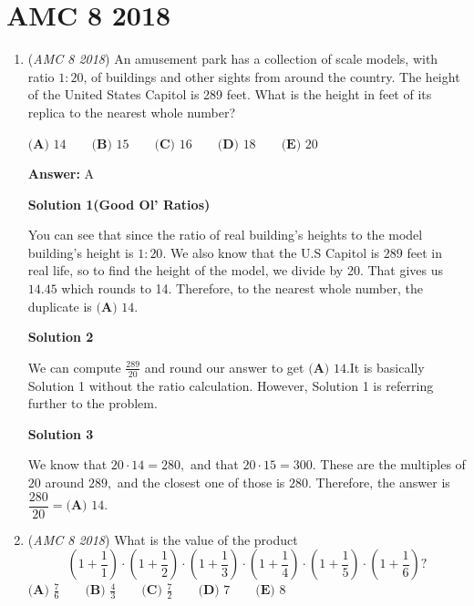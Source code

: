 \section{AMC 8 2018}
        \begin{enumerate}
        	\item (\textit{AMC 8 2018}) An amusement park has a collection of scale models, with ratio $1 : 20$, of buildings and other sights from around the country. The height of the United States Capitol is 289 feet. What is the height in feet of its replica to the nearest whole number?


 $\textbf{(A) }14\qquad\textbf{(B) }15\qquad\textbf{(C) }16\qquad\textbf{(D) }18\qquad\textbf{(E) }20$

 \textbf{Answer: }A



\textbf{Solution 1(Good Ol' Ratios)}

You can see that since the ratio of real building's heights to the model building's height is $1:20$. We also know that the U.S Capitol is $289$ feet in real life, so to find the height of the model, we divide by 20. That gives us $14.45$ which rounds to 14. Therefore, to the nearest whole number, the duplicate is $\boxed{\textbf{(A) }14}$.  

 



\textbf{Solution 2}

We can compute $\frac{289}{20}$ and round our answer to get $\boxed{\textbf{(A) }14}$.It is basically Solution 1 without the ratio calculation. However, Solution 1 is referring further to the problem.

 



\textbf{Solution 3}

We know that $20 \cdot 14 = 280 ,$ and that $20 \cdot 15 = 300 .$ These are the multiples of $20$ around $289 ,$ and the closest one of those is $280.$ Therefore, the answer is $\dfrac {280} {20} = \boxed{\textbf{(A) }14} .$



	\item (\textit{AMC 8 2018}) What is the value of the product
 \[\left(1+\frac{1}{1}\right)\cdot\left(1+\frac{1}{2}\right)\cdot\left(1+\frac{1}{3}\right)\cdot\left(1+\frac{1}{4}\right)\cdot\left(1+\frac{1}{5}\right)\cdot\left(1+\frac{1}{6}\right)?\]
$\textbf{(A) }\frac{7}{6}\qquad\textbf{(B) }\frac{4}{3}\qquad\textbf{(C) }\frac{7}{2}\qquad\textbf{(D) }7\qquad\textbf{(E) }8$


\end{enumerate}
